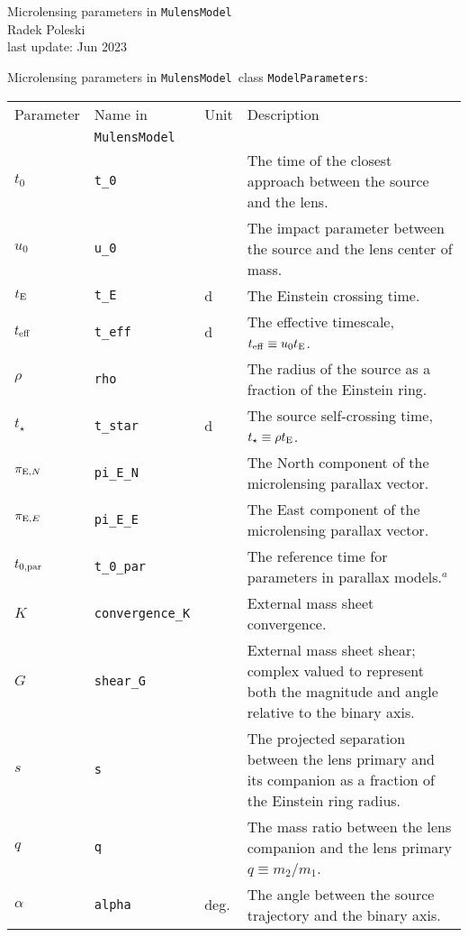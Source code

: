 \documentclass[12pt]{article}
\newcommand\MM{{\tt MulensModel}}
\begin{document}

\begin{center}
{\LARGE Microlensing parameters in \MM}\\
\bigskip
Radek Poleski\\
last update: Jun 2023
\end{center}

\bigskip
Microlensing parameters in \MM\, class {\tt ModelParameters}:

\begin{table*}[!h]
\begin{tabular}{l l l p{10cm}}
Parameter & Name in &  Unit & Description \\
 & \MM &  & \\
\hline
$t_0$ & {\tt t\_0} & & The time of the closest approach between the source and the lens. \\
$u_0$ & {\tt u\_0} & & The impact parameter between the source and the lens center of mass. \\
$t_{\rm E}$ & {\tt t\_E} & d & The Einstein crossing time. \\
$t_{\rm eff}$ & {\tt t\_eff} & d & The effective timescale, $t_{\rm eff} \equiv u_0 t_{\rm E}$. \\
$\rho$ & {\tt rho} & & The radius of the source as a fraction of the Einstein ring. \\
$t_{\star}$ & {\tt t\_star} & d & The source self-crossing time, $t_\star \equiv \rho t_{\rm E}$. \\
$\pi_{{\rm E}, N}$ & {\tt pi\_E\_N} & & The North component of the microlensing parallax vector. \\
$\pi_{{\rm E}, E}$ & {\tt pi\_E\_E} & & The East component of the microlensing parallax vector. \\
$t_{0,{\rm par}}$ & {\tt t\_0\_par} & & The reference time for parameters in parallax models.$^a$ \\
$K$ & {\tt convergence\_K} & & External mass sheet convergence. \\
$G$ & {\tt shear\_G} & & External mass sheet shear; complex valued to represent both the magnitude and angle relative to the binary axis. \\
$s$ & {\tt s} & & The projected separation between the lens primary and its companion as a fraction of the Einstein ring radius. \\
$q$ & {\tt q} & & The mass ratio between the lens companion and the lens primary $q \equiv m_2/m_1$. \\
$\alpha$ & {\tt alpha} & deg. & The angle between the source trajectory and the binary axis. \\

\end{tabular}
\end{table*}
\end{document}

